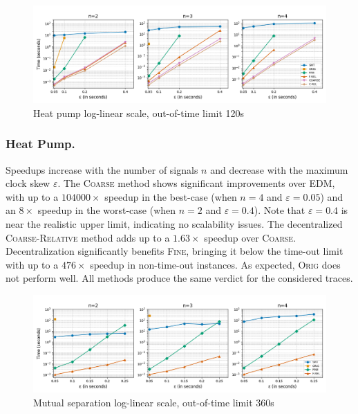 \begin{figure}[htb]
	\begin{center}
		\includegraphics[width=\linewidth]{wtlin.png}
		\caption{Heat pump log-linear scale, out-of-time limit 120s}
	\end{center}
\end{figure}

\subsubsection{Heat Pump.}
Speedups increase with the number of signals \(n\) and decrease with the maximum clock skew \(\varepsilon\).
The \textsc{Coarse} method shows significant improvements over EDM, with up to a $104000\times$ speedup in the best-case (when \(n=4\) and \(\varepsilon=0.05\)) and an $8\times$ speedup in the worst-case (when \(n=2\) and \(\varepsilon=0.4\)).
Note that \(\varepsilon=0.4\) is near the realistic upper limit, indicating no scalability issues.
The decentralized \textsc{Coarse-Relative} method adds up to a $1.63\times$ speedup over \textsc{Coarse}.
Decentralization significantly benefits \textsc{Fine}, bringing it below the time-out limit with up to a $476\times$ speedup in non-time-out instances.
As expected, \textsc{Orig} does not perform well.
All methods produce the same verdict for the considered traces.

\begin{figure}[htb]
	\begin{center}
		\includegraphics[width=\linewidth]{ms.png}
		\caption{Mutual separation log-linear scale, out-of-time limit 360s}
	\end{center}
\end{figure}

